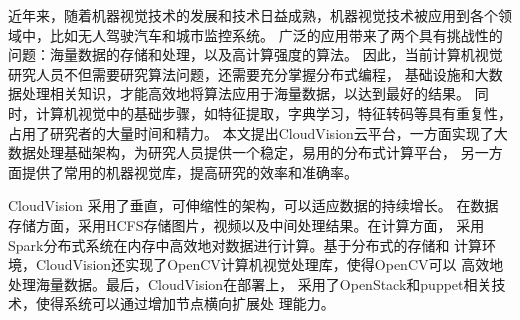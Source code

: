 \begin{cabstract}
    近年来，随着机器视觉技术的发展和技术日益成熟，机器视觉技术被应用到各个领域中，比如无人驾驶汽车和城市监控系统。
    广泛的应用带来了两个具有挑战性的问题：海量数据的存储和处理，以及高计算强度的算法。
    因此，当前计算机视觉研究人员不但需要研究算法问题，还需要充分掌握分布式编程，
    基础设施和大数据处理相关知识，才能高效地将算法应用于海量数据，以达到最好的结果。
    同时，计算机视觉中的基础步骤，如特征提取，字典学习，特征转码等具有重复性，占用了研究者的大量时间和精力。
    本文提出CloudVision云平台，一方面实现了大数据处理基础架构，为研究人员提供一个稳定，易用的分布式计算平台，
    另一方面提供了常用的机器视觉库，提高研究的效率和准确率。

    CloudVision 采用了垂直，可伸缩性的架构，可以适应数据的持续增长。
    在数据存储方面，采用HCFS存储图片，视频以及中间处理结果。在计算方面，
    采用Spark分布式系统在内存中高效地对数据进行计算。基于分布式的存储和
    计算环境，CloudVision还实现了OpenCV计算机视觉处理库，使得OpenCV可以
    高效地处理海量数据。最后，CloudVision在部署上，
    采用了OpenStack和puppet相关技术，使得系统可以通过增加节点横向扩展处
    理能力。


\end{cabstract}


